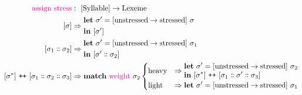 \documentclass{report}[12pt]
\begin{document}
\begin{align*}
  \text{\textcolor{magenta}{assign stress}} & :\ [\text{Syllable}] \rightarrow \text{Lexeme} \\
  [\sigma] & \Rightarrow \begin{aligned}
                           & \textbf{let}\ \sigma' = [\text{unstressed} \rightarrow \text{stressed}] \ \sigma \\
                           & \textbf{in}\ [\sigma'] \\
                         \end{aligned} \\
  [\sigma_1 \dblcolon \sigma_2] & \Rightarrow \begin{aligned}
                                                & \textbf{let}\ \sigma' = [\text{unstressed} \rightarrow \text{stressed}] \ \sigma_1 \\
                                                & \textbf{in}\ [\sigma' \dblcolon \sigma_2] \\
                                              \end{aligned} \\
  [\sigma^{*}]\ \texttt{++}\ [\sigma_1 \dblcolon \sigma_2 \dblcolon \sigma_3] & \Rightarrow \textbf{match}\ \text{\textcolor{magenta}{weight}}\ \sigma_2
                                                                                \begin{cases}
                                                                                  \text{heavy} & \Rightarrow \begin{aligned}
                                                                                                               & \textbf{let}\ \sigma' = [\text{unstressed} \rightarrow \text{stressed}]\ \sigma_2 \\
                                                                                                               & \textbf{in}\ [\sigma^{*}]\ \texttt{++}\ [\sigma_1 \dblcolon \sigma' \dblcolon \sigma_3] \\
                                                                                                             \end{aligned} \\
                                                                                  \text{light} & \Rightarrow \begin{aligned}
                                                                                                               & \textbf{let}\ \sigma' = [\text{unstressed} \rightarrow \text{stressed}]\ \sigma_1 \\

\end{aligned}
\end{cases}
\end{align*}
\end{document}
